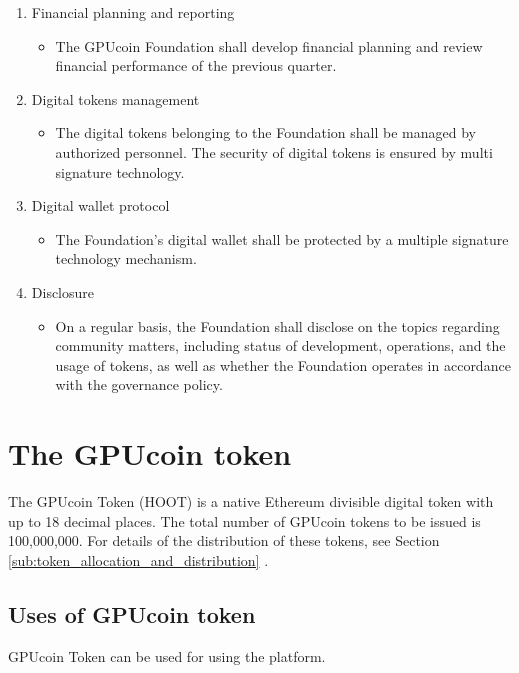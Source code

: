 \documentclass{article}
\begin{document}
\begin{enumerate}
 \item Financial planning and reporting
 \begin{itemize}
 \item The GPUcoin Foundation shall develop financial planning and review financial performance of the previous quarter.
 \end{itemize}

 \item Digital tokens management
 \begin{itemize}
 \item The digital tokens belonging to the Foundation shall be managed by authorized personnel. The security of digital tokens is ensured by multi signature technology.
 \end{itemize}

 \item Digital wallet protocol
 \begin{itemize}
 \item The Foundation’s digital wallet shall be protected by a multiple signature technology mechanism.
 \end{itemize}

 \item Disclosure
 \begin{itemize}
 \item On a regular basis, the Foundation shall disclose on the topics regarding community matters, including status of development, operations, and the usage of tokens, as well as whether the Foundation operates in accordance with the governance policy.
 \end{itemize}
\end{enumerate}


\section{The GPUcoin token}
The GPUcoin Token (HOOT) is a native Ethereum divisible digital token with up to 18 decimal places. The total number of GPUcoin tokens to be issued is 100,000,000. For details of the distribution of these tokens, see Section \ref{sub:token_allocation_and_distribution} .

\subsection{Uses of GPUcoin token} %
\label{sub:uses_of_hoot_token}
GPUcoin Token can be used for using the platform.

\end{document}
